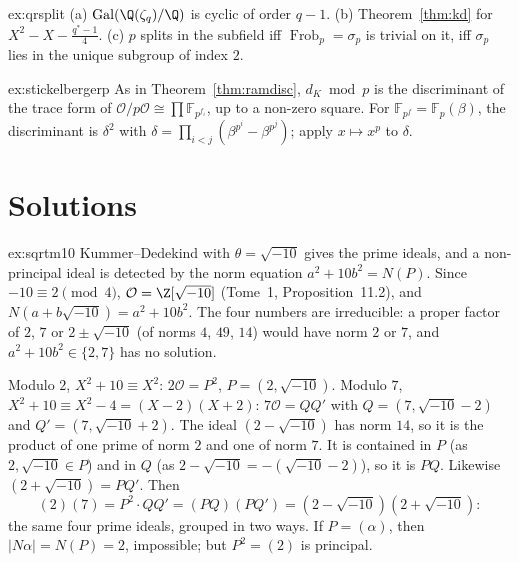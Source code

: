 \begin{hint}{ex:qrsplit}
(a) $\operatorname{Gal}(\Q(\zeta_q)/\Q)$ is cyclic of order $q-1$. (b) Theorem~\ref{thm:kd} for $X^2-X-\frac{q^*-1}4$.
(c) $p$ splits in the subfield iff $\operatorname{Frob}_p=\sigma_p$ is trivial on it, iff $\sigma_p$ lies in the unique
subgroup of index $2$.
\end{hint}
\begin{hint}{ex:stickelbergerp}
As in Theorem~\ref{thm:ramdisc}, $d_K\bmod p$ is the discriminant of the trace form of $\mathcal O/p\mathcal O\cong\prod
\mathbb F_{p^{f_i}}$, up to a non-zero square. For $\mathbb F_{p^f}=\mathbb F_p(\beta)$, the discriminant is $\delta^2$
with $\delta=\prod_{i<j}(\beta^{p^i}-\beta^{p^j})$; apply $x\mapsto x^p$ to $\delta$.
\end{hint}

\section{Solutions}

\begin{solution}{ex:sqrtm10}
\idea Kummer--Dedekind with $\theta=\sqrt{-10}$ gives the prime ideals, and a non-principal ideal is detected by the norm
equation $a^2+10b^2=N(P)$.
\writeup Since $-10\equiv2\pmod 4$, $\mathcal O=\Z[\sqrt{-10}]$ (Tome~1, Proposition~11.2), and $N(a+b\sqrt{-10})=a^2+10b^2$.
The four numbers are irreducible: a proper factor of $2$, $7$ or $2\pm\sqrt{-10}$ (of norms $4$, $49$, $14$) would have
norm $2$ or $7$, and $a^2+10b^2\in\{2,7\}$ has no solution.

Modulo $2$, $X^2+10\equiv X^2$: $2\mathcal O=P^2$, $P=(2,\sqrt{-10})$. Modulo $7$, $X^2+10\equiv X^2-4=(X-2)(X+2)$:
$7\mathcal O=QQ'$ with $Q=(7,\sqrt{-10}-2)$ and $Q'=(7,\sqrt{-10}+2)$. The ideal $(2-\sqrt{-10})$ has norm $14$, so it is
the product of one prime of norm $2$ and one of norm $7$. It is contained in $P$ (as $2,\sqrt{-10}\in P$) and in $Q$ (as
$2-\sqrt{-10}=-(\sqrt{-10}-2)$), so it is $PQ$. Likewise $(2+\sqrt{-10})=PQ'$. Then
\[
(2)(7)=P^2\cdot QQ'=(PQ)(PQ')=(2-\sqrt{-10})(2+\sqrt{-10}):
\]
the same four prime ideals, grouped in two ways. If $P=(\alpha)$, then $|N\alpha|=N(P)=2$, impossible; but $P^2=(2)$ is
principal.
\end{solution}

